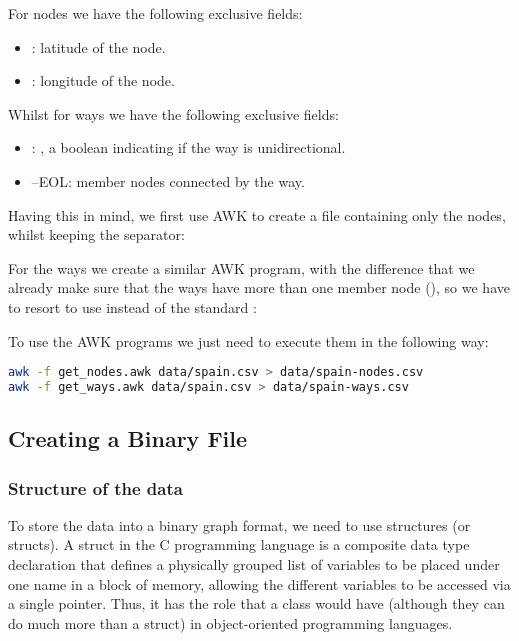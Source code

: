 For nodes we have the following exclusive fields:
\begin{itemize}
    \item {}: latitude of the node.
    \item {}: longitude of the node.
\end{itemize}

Whilst for ways we have the following exclusive fields:
\begin{itemize}
    \item {}: , a boolean indicating if the way is unidirectional.
    \item {}--EOL: member nodes connected by the way.
\end{itemize}

\bigskip
Having this in mind, we first use AWK to create a file containing only the nodes, whilst keeping the \inline{|} separator:

For the ways we create a similar AWK program, with the difference that we already make sure that the ways have more than one member node (), so we have to resort to use  instead of the standard :

To use the AWK programs we just need to execute them in the following way:
\begin{lstlisting}[language=bash]
awk -f get_nodes.awk data/spain.csv > data/spain-nodes.csv
awk -f get_ways.awk data/spain.csv > data/spain-ways.csv
\end{lstlisting}

\subsection{Creating a Binary File}\label{sec:w_bin}

\subsubsection*{Structure of the data}
To store the data into a binary graph format, we need to use structures (or structs). A struct in the C programming language is a composite data type declaration that defines a physically grouped list of variables to be placed under one name in a block of memory, allowing the different variables to be accessed via a single pointer. Thus, it has the role that a class would have (although they can do much more than a struct) in object-oriented programming languages.

